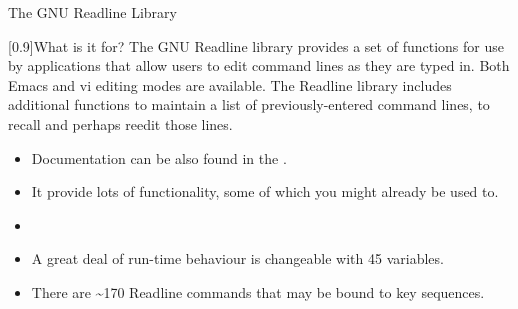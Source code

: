 
\begin{frame}{The GNU Readline Library}{}
    \vspace{-1mm}
    \begin{varblock}{}[0.9\textwidth]{What is it for?}
        The GNU Readline library provides a set of functions for use by applications that \alert{allow users to edit command lines as they are typed in}.
        Both Emacs and vi editing modes are available.
        The Readline library includes additional functions to maintain a list of previously-entered command lines, to recall and perhaps reedit those lines.
    \end{varblock}
    \vspace{2mm}
    \begin{itemize}[<2>]
        \setlength{\itemsep}{2mm}
        \item Documentation can be also found in the .
        \item It provide lots of functionality, some of which you might already be used to.
        \item {}
        \item A great deal of run-time behaviour is changeable with \alert{45 variables}. 
        \item There are \alert{\textasciitilde170 Readline commands} that may be bound to key sequences. 
    \end{itemize}
\end{frame}
